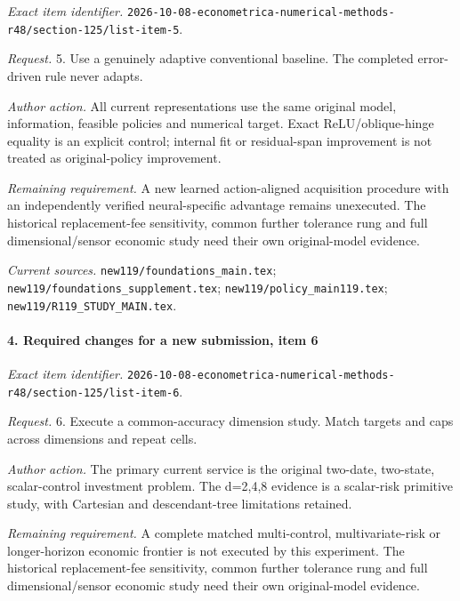 \emph{Exact item identifier.} \nolinkurl{2026-10-08-econometrica-numerical-methods-r48/section-125/list-item-5}.

\par\emph{Request.} 5. Use a genuinely adaptive conventional baseline. The completed error-driven rule never adapts.

\par\emph{Author action.} All current representations use the same original model, information, feasible policies and numerical target. Exact ReLU/\allowbreak{}oblique-hinge equality is an explicit control; internal fit or residual-span improvement is not treated as original-policy improvement.

\par\emph{Remaining requirement.} A new learned action-aligned acquisition procedure with an independently verified neural-specific advantage remains unexecuted. The historical replacement-fee sensitivity, common further tolerance rung and full dimensional/\allowbreak{}sensor economic study need their own original-model evidence.

\par\emph{Current sources.} \nolinkurl{new119/foundations_main.tex}; \nolinkurl{new119/foundations_supplement.tex}; \nolinkurl{new119/policy_main119.tex}; \nolinkurl{new119/R119_STUDY_MAIN.tex}.

\paragraph{4. Required changes for a new submission, item 6}

\emph{Exact item identifier.} \nolinkurl{2026-10-08-econometrica-numerical-methods-r48/section-125/list-item-6}.

\par\emph{Request.} 6. Execute a common-accuracy dimension study. Match targets and caps across dimensions and repeat cells.

\par\emph{Author action.} The primary current service is the original two-date, two-state, scalar-control investment problem. The d=2,4,8 evidence is a scalar-risk primitive study, with Cartesian and descendant-tree limitations retained.

\par\emph{Remaining requirement.} A complete matched multi-control, multivariate-risk or longer-horizon economic frontier is not executed by this experiment. The historical replacement-fee sensitivity, common further tolerance rung and full dimensional/\allowbreak{}sensor economic study need their own original-model evidence.

